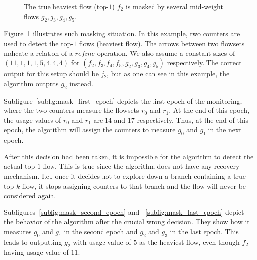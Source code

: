 \begin{figure}
{
    }
    \caption[An example of masking the top-$1$ flow]{The true heaviest flow (top-$1$) $f_2$ is masked by several mid-weight flows $g_2, g_3, g_4, g_5$.}
    \label{fig:mask}
\end{figure}

Figure~\ref{fig:mask} illustrates such masking situation. In this example, two counters are used to detect the top-$1$ flows (heaviest flow). The arrows between two flowsets indicate a relation of a $refine$ operation. We also assume a constant sizes of $(11, 1, 1, 1, 5, 4, 4, 4)$ for $(f_2, f_3, f_4, f_5, g_2, g_3, g_4, g_5)$ respectively. The correct output for this setup should be $f_2$, but as one can see in this example, the algorithm outputs $g_2$ instead.

Subfigure~\ref{subfig:mask_first_epoch} depicts the first epoch of the monitoring, where the two counters measure the flowsets $r_0$ and $r_1$. At the end of this epoch, the usage values of $r_0$ and $r_1$ are $14$ and $17$ respectively. Thus, at the end of this epoch, the algorithm will assign the counters to measure $g_0$ and $g_1$ in the next epoch.

After this decision had been taken, it is impossible for the algorithm to detect the actual top-$1$ flow. This is true since the algorithm does not have any recovery mechanism. I.e., once it decides not to explore down a branch containing a true top-$k$ flow, it stops assigning counters to that branch and the flow will never be considered again.

Subfigures~\ref{subfig:mask_second_epoch} and ~\ref{subfig:mask_last_epoch} depict the behavior of the algorithm after the crucial wrong decision. They show how it measures $g_0$ and $g_1$ in the second epoch and $g_2$ and $g_3$ in the last epoch. This leads to outputting $g_2$ with usage value of $5$ as the heaviest flow, even though $f_2$ having usage value of $11$.

